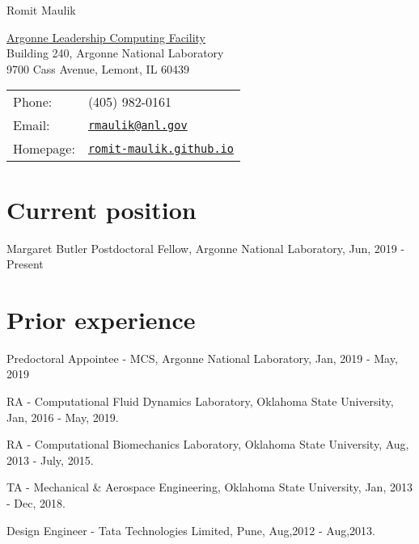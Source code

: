 \documentclass[letterpaper]{article}
\def\name{Romit Maulik}
\renewenvironment{itemize}{
  \begin{list}{}{
    \setlength{\leftmargin}{1.5em}
  }
}{
  \end{list}
}
\begin{document}
{\huge \name}


\vspace{0.25in}

\begin{minipage}{0.45\linewidth}
  \href{http://www.mcs.anl.gov/}{Argonne Leadership Computing Facility} \\
  Building 240, Argonne National Laboratory \\
  9700 Cass Avenue, Lemont, IL 60439
\end{minipage}
\begin{minipage}{0.45\linewidth}
  \begin{tabular}{ll}
    Phone: & (405) 982-0161 \\
    Email: & \href{mailto:rmaulik@anl.gov}{\tt rmaulik@anl.gov} \\
    Homepage: & \href{https://romit-maulik.github.io/}{\tt romit-maulik.github.io} \\
  \end{tabular}
\end{minipage}


\section*{Current position}
\begin{itemize}
\item Margaret Butler Postdoctoral Fellow, Argonne National Laboratory, Jun, 2019 - Present
\end{itemize}

\section*{Prior experience}

\begin{itemize}
\item Predoctoral Appointee - MCS, Argonne National Laboratory, Jan, 2019 - May, 2019
\item RA - Computational Fluid Dynamics Laboratory, Oklahoma State University, Jan, 2016 - May, 2019.
\item RA - Computational Biomechanics Laboratory, Oklahoma State University, Aug, 2013 - July, 2015.
\item TA - Mechanical \& Aerospace Engineering, Oklahoma State University, Jan, 2013 - Dec, 2018.
\item Design Engineer - Tata Technologies Limited, Pune, Aug,2012 - Aug,2013.
\end{itemize}
\end{document}
